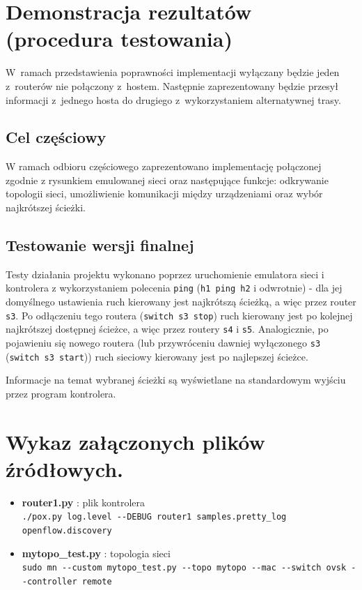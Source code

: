 \documentclass{article}
\begin{document}
	\section{Demonstracja rezultatów (procedura testowania)}
	W~ramach przedstawienia poprawności implementacji wyłączany będzie jeden z~routerów nie połączony z~hostem. Następnie zaprezentowany będzie przesył informacji z~jednego hosta do drugiego z~wykorzystaniem alternatywnej trasy. 
	\subsection{Cel częściowy}
	W ramach odbioru częściowego zaprezentowano implementację połączonej zgodnie z rysunkiem emulowanej sieci oraz następujące funkcje: odkrywanie topologii sieci, umożliwienie komunikacji między urządzeniami oraz wybór najkrótszej ścieżki.
	\subsection{Testowanie wersji finalnej}
	Testy działania projektu wykonano poprzez uruchomienie emulatora sieci i kontrolera z wykorzystaniem polecenia \texttt{ping} (\texttt{h1 ping h2} i odwrotnie) - dla jej domyślnego ustawienia ruch kierowany jest najkrótszą ścieżką, a więc przez router \texttt{s3}. Po odłączeniu tego routera (\verb|switch s3 stop|) ruch kierowany jest po kolejnej najkrótszej dostępnej ścieżce, a więc przez routery \texttt{s4} i \texttt{s5}. Analogicznie, po pojawieniu się nowego routera (lub przywróceniu dawniej wyłączonego \texttt{s3} (\verb|switch s3 start|)) ruch sieciowy kierowany jest po najlepszej ścieżce.
	
	Informacje na temat wybranej ścieżki są wyświetlane na standardowym wyjściu przez program kontrolera.
	

	\section{Wykaz załączonych plików źródłowych.}
	\begin{itemize}
		\item \textbf{router1.py} : plik kontrolera \\ 
		\verb|./pox.py log.level --DEBUG router1 samples.pretty_log openflow.discovery|
		\item \textbf{mytopo\_test.py} : topologia sieci \\
		\verb|sudo mn --custom mytopo_test.py --topo mytopo --mac --switch ovsk --controller remote|%
	\end{itemize}
	
\end{document}
